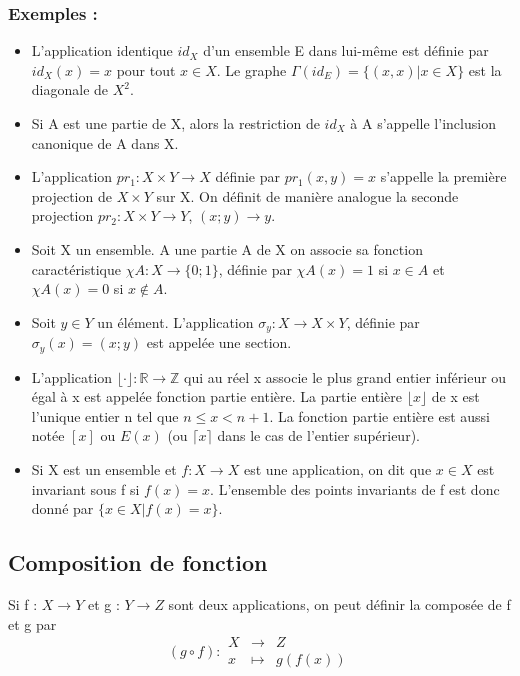 \documentclass[a4paper,10pt]{book}
\newcommand{\R}{\mathbb{R}}
\newcommand{\Z}{\mathbb{Z}}
\begin{document}
\subsubsection{Exemples :}
\begin{itemize}\renewcommand{\labelitemi}{$\bullet$}
\item L'application identique $id_{X}$ d’un ensemble E dans lui-même est définie par $id_{X} (x) = x$ pour tout $x \in X$. Le graphe $\Gamma(id_{E}) = \{(x, x) | x \in X\}$ est la diagonale de $X^{2}$.
\item Si A est une partie de X, alors la restriction de $id_{X}$ à A s’appelle l’inclusion canonique
de A dans X.
\item L’application $pr_{1} : X \times Y \longrightarrow X$ définie par $pr_{1} (x,y) = x$ s’appelle la première projection de $X \times Y$ sur X. On définit de manière analogue la seconde projection $pr_{2} : X \times Y \longrightarrow Y$, $(x;y) \longrightarrow y$.
\item Soit X un ensemble. A une partie A de X on associe sa fonction caractéristique $\chi A : X \longrightarrow
\{0;1\}$, définie par $\chi A(x) = 1$ si $x \in A$ et $\chi A (x) = 0$ si $x \notin A$.
\item Soit $y \in Y$ un élément. L’application $\sigma_{y} : X \longrightarrow X \times Y$, définie par $\sigma_{y}(x) = (x;y)$ est appelée une section.
\item L’application $\lfloor\cdot\rfloor : \R \longrightarrow \Z$ qui au réel x associe le plus grand entier inférieur ou égal à x est appelée fonction partie entière. La partie entière $\lfloor x\rfloor$ de x est l’unique entier n tel que $n\leq x<n+1$.
La fonction partie entière est aussi notée $[x]$ ou $E(x)$ (ou $\lceil x\rceil$ dans le cas de l'entier supérieur).
\item Si X est un ensemble et $f : X \longrightarrow X$ est une application, on dit que $x \in X$ est invariant sous f si $f(x)=x$. L’ensemble des points invariants de f est donc donné par $\{x \in X | f(x)=x\}$.
\end{itemize}

\subsection{Composition de fonction}
Si f : $X \longrightarrow Y$ et g : $Y \longrightarrow Z$ sont deux applications, on peut définir la composée de f et g par \begin{displaymath} (g\circ f) : \begin{array}{rcl}
X &\longrightarrow & Z \\
x &\longmapsto & g(f(x))\end{array} \end{displaymath}
\end{document}

